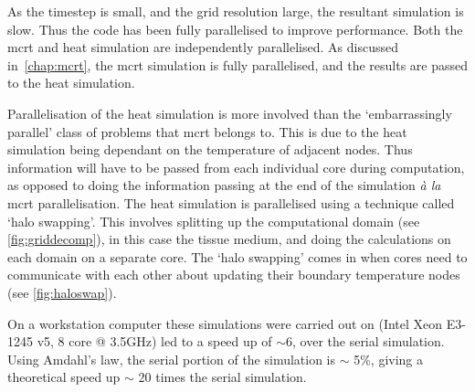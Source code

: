 As the timestep is small, and the grid resolution large, the resultant simulation is slow. Thus the code has been fully parallelised to improve performance. Both the \gls{mcrt} and heat simulation are independently parallelised. As discussed in~\cref{chap:mcrt}, the \gls{mcrt} simulation is fully parallelised, and the results are passed to the heat simulation.

\medskip

Parallelisation of the heat simulation is more involved than the `embarrassingly parallel' class of problems that \gls{mcrt} belongs to. This is due to the heat simulation being dependant on the temperature of adjacent nodes. Thus information will have to be passed from each individual core during computation, as opposed to doing the information passing at the end of the simulation \textit{\`a la} \gls{mcrt} parallelisation.
The heat simulation is parallelised using a technique called `halo swapping'. This involves splitting up the computational domain (see \cref{fig:griddecomp}), in this case the tissue medium, and doing the calculations on each domain on a separate core. The `halo swapping' comes in when cores need to communicate with each other about updating their boundary temperature nodes (see \cref{fig:haloswap}).

On a workstation computer these simulations were carried out on (Intel Xeon E3-1245 v5, 8 core @ 3.5GHz) led to a speed up of $\sim$6, over the serial simulation. Using Amdahl's law\cite{amdahl1967validity}, the serial portion of the simulation is $\sim$ 5\%, giving a theoretical speed up $\sim$ 20 times the serial simulation.


